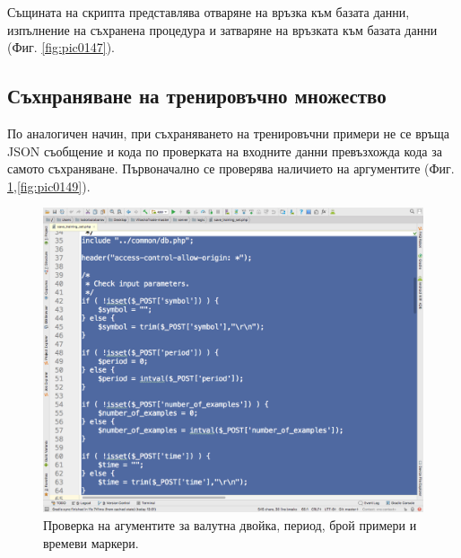 \documentclass[book,14pt,oneside,openany]{memoir}
\begin{document}
Същината на скрипта представлява отваряне на връзка към базата данни, изпълнение на съхранена процедура и затваряне на връзката към базата данни (Фиг. \ref{fig:pic0147}).

\subsection{Съхнраняване на тренировъчно множество}

По аналогичен начин, при съхраняването на тренировъчни примери не се връща JSON съобщение и кода по проверката на входните данни превъзхожда кода за самото съхраняване. Първоначално се проверява наличието на аргументите (Фиг. \ref{fig:pic0148},\ref{fig:pic0149}).

\begin{figure}[h]
  \centering
  \includegraphics[height=0.45\pdfpageheight]{pic0148}
  \caption{Проверка на агументите за валутна двойка, период, брой примери и времеви маркери.}
\label{fig:pic0148}
\end{figure}
\FloatBarrier
\end{document}
